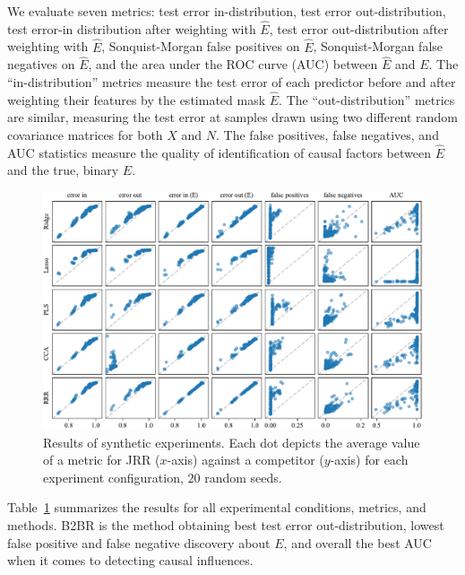 We evaluate seven metrics: 
%
test error in-distribution, test error out-distribution, test error-in distribution after weighting with $\hat{E}$, test error out-distribution after weighting with $\hat{E}$, Sonquist-Morgan false positives on $\hat{E}$, Sonquist-Morgan false negatives on $\hat{E}$, and the area under the ROC curve (AUC) between $\hat{E}$ and $E$.
%
The ``in-distribution'' metrics measure the test error of each predictor before and after weighting their features by the estimated mask $\hat{E}$.
%
The ``out-distribution'' metrics are similar, measuring the test error at samples drawn using two different random covariance matrices for both $X$ and $N$.
%
The false positives, false negatives, and AUC statistics measure the quality of identification of causal factors between $\hat{E}$ and the true, binary $E$. 

\begin{figure}[htpb]
    \centering
    \includegraphics[width=\textwidth]{synthetic.pdf}
    \caption{Results of synthetic experiments. Each dot depicts the average value of a metric for JRR ($x$-axis) against a competitor ($y$-axis) for each experiment configuration, $20$ random seeds.}
    \label{table:synthetic}
\end{figure}

Table~\ref{table:synthetic} summarizes the results for all experimental conditions, metrics, and methods.
%
B2BR is the method obtaining best test error out-distribution, lowest false positive and false negative discovery about $E$, and overall the best AUC when it comes to detecting causal influences.

